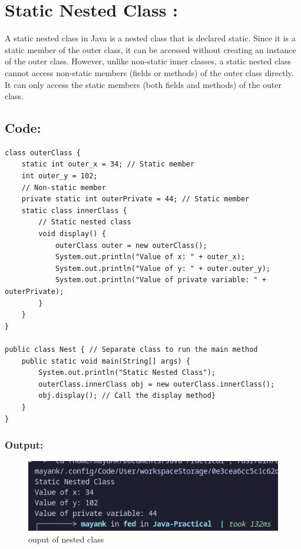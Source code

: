 \documentclass[a4paper,12pt]{article}
\begin{document}
\section{Static Nested Class :}
A static nested class in Java is a nested class that is declared static. Since it is a static
member of the outer class, it can be accessed without creating an instance of the outer
class.
However, unlike non-static inner classes, a static nested class cannot access non-static
members (fields or methods) of the outer class directly. It can only access the static
members (both fields and methods) of the outer class.

\subsection{Code: }
\begin{lstlisting}
class outerClass {
    static int outer_x = 34; // Static member
    int outer_y = 102;
    // Non-static member
    private static int outerPrivate = 44; // Static member
    static class innerClass {
        // Static nested class
        void display() {
            outerClass outer = new outerClass();
            System.out.println("Value of x: " + outer_x);
            System.out.println("Value of y: " + outer.outer_y);
            System.out.println("Value of private variable: " + outerPrivate);
        }
    }
}

public class Nest { // Separate class to run the main method
    public static void main(String[] args) {
        System.out.println("Static Nested Class");
        outerClass.innerClass obj = new outerClass.innerClass();
        obj.display(); // Call the display method}
    }
}
\end{lstlisting}
\subsubsection{Output: }
\begin{figure}[H]
    \centering
    \includegraphics[width=0.9\linewidth]{images/nest.png}
    \caption{ouput of nested class}
    \label{fig:sample_image}
\end{figure}
\end{document}
